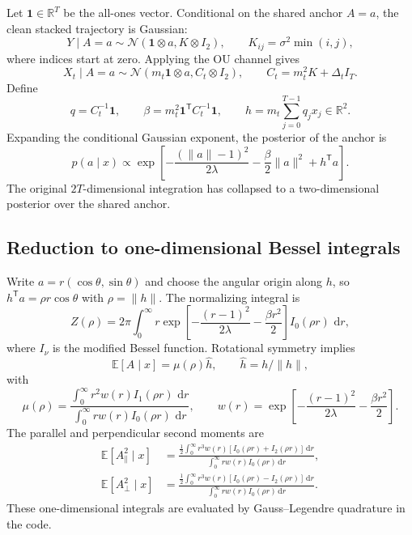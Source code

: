 \documentclass[11pt,a4paper]{article}
\newcommand{\R}{\mathbb{R}}
\newcommand{\E}{\mathbb{E}}
\newcommand{\N}{\mathcal{N}}
\newcommand{\dd}{\,\mathrm d}
\begin{document}
Let $\mathbf 1\in\R^T$ be the all-ones vector. Conditional on the shared anchor $A=a$, the clean stacked trajectory is Gaussian:
\begin{equation}
 Y\mid A=a\sim\N(\mathbf1\otimes a,K\otimes I_2),
 \qquad K_{ij}=\sigma^2\min(i,j),
 \label{eq:surrogate-K}
\end{equation}
where indices start at zero. Applying the OU channel gives
\begin{equation}
 X_t\mid A=a\sim
 \N(m_t\mathbf1\otimes a,C_t\otimes I_2),
 \qquad C_t=m_t^2K+\Delta_t I_T.
 \label{eq:surrogate-C}
\end{equation}
Define
\begin{equation}
 q=C_t^{-1}\mathbf1,
 \qquad
 \beta=m_t^2\mathbf1^\mathsf{T}C_t^{-1}\mathbf1,
 \qquad
 h=m_t\sum_{j=0}^{T-1}q_jx_j\in\R^2.
 \label{eq:q-beta-h}
\end{equation}
Expanding the conditional Gaussian exponent, the posterior of the anchor is
\begin{equation}
 p(a\mid x)\propto
 \exp\left[
 -\frac{(\|a\|-1)^2}{2\lambda}
 -\frac{\beta}{2}\|a\|^2
 +h^\mathsf{T}a
 \right].
 \label{eq:anchor-posterior}
\end{equation}
The original $2T$-dimensional integration has collapsed to a two-dimensional posterior over the shared anchor.

\subsection{Reduction to one-dimensional Bessel integrals}

Write $a=r(\cos\theta,\sin\theta)$ and choose the angular origin along $h$, so $h^\mathsf{T}a=\rho r\cos\theta$ with $\rho=\|h\|$. The normalizing integral is
\begin{equation}
 Z(\rho)=2\pi\int_0^\infty
 r\exp\left[-\frac{(r-1)^2}{2\lambda}-\frac{\beta r^2}{2}\right]
 I_0(\rho r)\,\dd r,
 \label{eq:bessel-z}
\end{equation}
where $I_\nu$ is the modified Bessel function. Rotational symmetry implies
\begin{equation}
 \E[A\mid x]=\mu(\rho)\widehat h,
 \qquad \widehat h=h/\|h\|,
\end{equation}
with
\begin{equation}
 \mu(\rho)=
 \frac{\int_0^\infty r^2w(r)I_1(\rho r)\,\dd r}
 {\int_0^\infty r w(r)I_0(\rho r)\,\dd r},
 \qquad
 w(r)=\exp\left[-\frac{(r-1)^2}{2\lambda}-\frac{\beta r^2}{2}\right].
 \label{eq:anchor-mean}
\end{equation}
The parallel and perpendicular second moments are
\begin{align}
 \E[A_\parallel^2\mid x]
 &=\frac{\frac12\int_0^\infty r^3w(r)
 [I_0(\rho r)+I_2(\rho r)]\dd r}
 {\int_0^\infty rw(r)I_0(\rho r)\dd r},\\
 \E[A_\perp^2\mid x]
 &=\frac{\frac12\int_0^\infty r^3w(r)
 [I_0(\rho r)-I_2(\rho r)]\dd r}
 {\int_0^\infty rw(r)I_0(\rho r)\dd r}.
 \label{eq:anchor-second}
\end{align}
These one-dimensional integrals are evaluated by Gauss--Legendre quadrature in the code.
\end{document}
